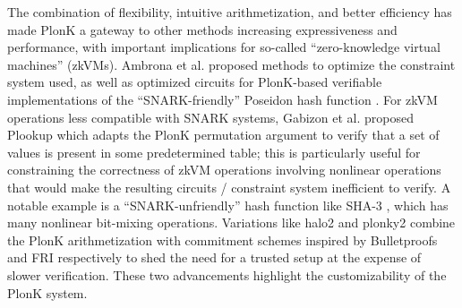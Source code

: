 \noindent The combination of flexibility, intuitive arithmetization, and better efficiency has made PlonK a gateway to other methods increasing expressiveness and performance, with important implications for so-called ``zero-knowledge virtual machines'' (zkVMs). Ambrona et al. \cite{turboplonk} proposed methods to optimize the constraint system used, as well as optimized circuits for PlonK-based verifiable implementations of the ``SNARK-friendly'' Poseidon hash function \cite{poseidon}. For zkVM operations less compatible with SNARK systems, Gabizon et al. proposed Plookup \cite{plookup} which adapts the PlonK permutation argument to verify that a set of values is present in some predetermined table; this is particularly useful for constraining the correctness of zkVM operations involving nonlinear operations that would make the resulting circuits / constraint system inefficient to verify. A notable example is a ``SNARK-unfriendly'' hash function like SHA-3 \cite{sha3}, which has many nonlinear bit-mixing operations. Variations like halo2 \cite{halo2} and plonky2 \cite{plonky2} combine the PlonK arithmetization with commitment schemes inspired by Bulletproofs \cite{bulletproofs} and FRI \cite{fri} respectively to shed the need for a trusted setup at the expense of slower verification. These two advancements highlight the customizability of the PlonK system.




